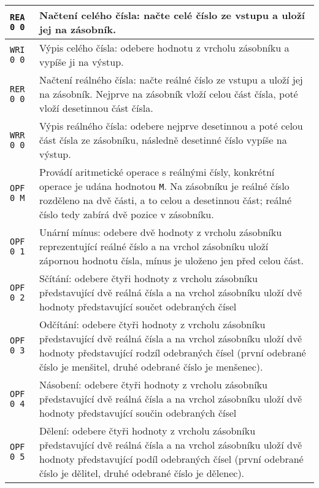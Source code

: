 \documentclass{article}
\begin{document}
\begin{longtable}{|l| p{10cm}|}
		\rule{0pt}{3ex} \texttt{REA 0 0} & Načtení celého čísla: načte celé číslo ze vstupu a uloží jej na zásobník. \\ \hline
		
		\rule{0pt}{3ex} \texttt{WRI 0 0} & Výpis celého čísla: odebere hodnotu z vrcholu zásobníku a vypíše ji na výstup. \\ \hline
		
		\rule{0pt}{3ex} \texttt{RER 0 0} & Načtení reálného čísla: načte reálné číslo ze vstupu a uloží jej na zásobník. Nejprve na zásobník vloží celou část čísla, poté vloží desetinnou část čísla. \\ \hline
		
		\rule{0pt}{3ex} \texttt{WRR 0 0} & Výpis reálného čísla: odebere nejprve desetinnou a poté celou část čísla ze zásobníku, následně desetinné číslo vypíše na výstup.\\ \hline
		
		\rule{0pt}{3ex} \texttt{OPF 0 M} & Provádí aritmetické operace s reálnými čísly, konkrétní operace je udána hodnotou \texttt{M}. Na zásobníku je reálné číslo rozděleno na dvě části, a to celou a desetinnou část; reálné číslo tedy zabírá dvě pozice v zásobníku.\\
		
		\rule{0pt}{4ex} \texttt{OPF 0 1} & Unární mínus: odebere dvě hodnoty z vrcholu zásobníku reprezentující reálné číslo a na vrchol zásobníku uloží zápornou hodnotu čísla, mínus je uloženo jen před celou část. \\
		
		\rule{0pt}{4ex} \texttt{OPF 0 2} & Sčítání: odebere čtyři hodnoty z vrcholu zásobníku představující dvě reálná čísla a na vrchol zásobníku uloží dvě hodnoty představující součet odebraných čísel \\
		
		\rule{0pt}{4ex} \texttt{OPF 0 3} & Odčítání: odebere čtyři hodnoty z vrcholu zásobníku představující dvě reálná čísla a na vrchol zásobníku uloží dvě hodnoty představující rodzíl odebraných čísel (první odebrané číslo je menšitel, druhé odebrané číslo je menšenec). \\
		
		\rule{0pt}{4ex} \texttt{OPF 0 4} & Násobení: odebere čtyři hodnoty z vrcholu zásobníku představující dvě reálná čísla a na vrchol zásobníku uloží dvě hodnoty představující součin odebraných čísel \\
		
		\rule{0pt}{4ex} \texttt{OPF 0 5} & Dělení: odebere čtyři hodnoty z vrcholu zásobníku představující dvě reálná čísla a na vrchol zásobníku uloží dvě hodnoty představující podíl odebraných čísel (první odebrané číslo je dělitel, druhé odebrané číslo je dělenec). \\		
		

\end{longtable}
\end{document}
